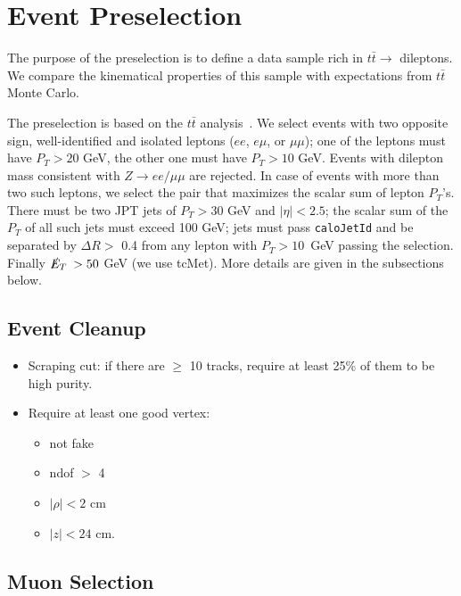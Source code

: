\section{Event Preselection}
\label{sec:eventSel}
The purpose of the preselection is to define a data sample rich 
in $t\bar{t} \to$ dileptons.  We compare the kinematical 
properties of this sample with expectations from $t\bar{t}$ 
Monte Carlo.

The preselection is based on the 
$t\bar{t}$ analysis~\cite{ref:top}.  
We select events with two opposite sign, well-identified and isolated
leptons ($ee$, $e\mu$, or $\mu\mu$); one of the leptons must 
have $P_T > 20$ GeV,
the other one must have $P_T > 10$ GeV. Events with dilepton mass
consistent with $Z \to ee/\mu\mu$ are rejected.
In case of events with 
more than two such leptons, we select the pair that maximizes the scalar 
sum of lepton $P_T$'s.
There must be two JPT
jets of $P_T > 30$ GeV and $|\eta| < 2.5$; the scalar sum of the 
$P_T$ of all such jets must exceed 100 GeV; jets must pass
{\tt caloJetId} and be separated by $\Delta R >$ 0.4 from any 
lepton with $P_T > 10$~GeV passing the selection.
Finally $\met > 50$ GeV (we use tcMet). More details are given in the subsections below.

\subsection{Event Cleanup}
\label{sec:cleanup}
\begin{itemize}
\item Scraping cut: if there are $\geq$ 10 tracks, require at
least 25\% of them to be high purity.
\item Require at least one good vertex:
\begin{itemize}
\item not fake
\item ndof $>$ 4
\item $|\rho| < 2$ cm
\item $|z| < 24$ cm.  
\end{itemize}
\end{itemize}


\subsection{Muon Selection}
\label{sec:muon}

